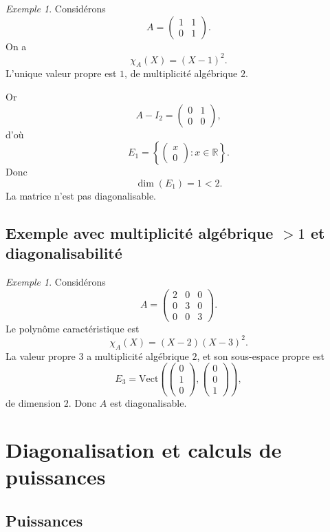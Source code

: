\documentclass[11pt,a4paper]{article}
\theoremstyle{remark}
\newtheorem{exemple}[definition]{Exemple}
\newcommand{\R}{\mathbb{R}}
\newcommand{\Vect}{\mathrm{Vect}}
\begin{document}
\begin{exemple}
Considérons
\[
A=
\begin{pmatrix}
1 & 1\\
0 & 1
\end{pmatrix}.
\]
On a
\[
\chi_A(X)=(X-1)^2.
\]
L’unique valeur propre est \(1\), de multiplicité algébrique \(2\).

Or
\[
A-I_2=
\begin{pmatrix}
0 & 1\\
0 & 0
\end{pmatrix},
\]
d’où
\[
E_1=
\left\{
\begin{pmatrix}
x\\0
\end{pmatrix}
: x\in\R
\right\}.
\]
Donc
\[
\dim(E_1)=1<2.
\]
La matrice n’est pas diagonalisable.
\end{exemple}

\subsection{Exemple avec multiplicité algébrique \(>1\) et diagonalisabilité}

\begin{exemple}
Considérons
\[
A=
\begin{pmatrix}
2 & 0 & 0\\
0 & 3 & 0\\
0 & 0 & 3
\end{pmatrix}.
\]
Le polynôme caractéristique est
\[
\chi_A(X)=(X-2)(X-3)^2.
\]
La valeur propre \(3\) a multiplicité algébrique \(2\), et son sous-espace propre est
\[
E_3=
\Vect\left(
\begin{pmatrix}
0\\1\\0
\end{pmatrix},
\begin{pmatrix}
0\\0\\1
\end{pmatrix}
\right),
\]
de dimension \(2\). Donc \(A\) est diagonalisable.
\end{exemple}

\section{Diagonalisation et calculs de puissances}

\subsection{Puissances}
\end{document}
